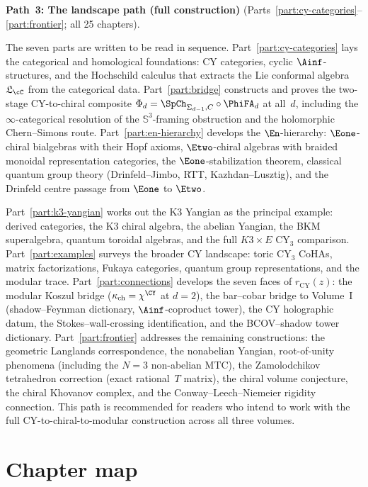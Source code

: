 \medskip

\noindent\textbf{Path~3: The landscape path (full construction)}
(Parts~\ref{part:cy-categories}--\ref{part:frontier};
all 25 chapters).

\smallskip

\noindent
The seven parts are written to be read in sequence.
Part~\ref{part:cy-categories} lays the categorical and
homological foundations: CY categories, cyclic
$\Ainf$-structures, and the Hochschild calculus that extracts
the Lie conformal algebra~$\mathfrak{L}_\cC$ from the
categorical data. Part~\ref{part:bridge} constructs and proves
the two-stage CY-to-chiral composite
$\Phi_d = \SpCh_{\Sigma_{d-1}, C}\circ\PhiFA_d$ at all~$d$,
including the $\infty$-categorical resolution of the
$\mathbb{S}^3$-framing obstruction and the holomorphic
Chern--Simons route. Part~\ref{part:en-hierarchy} develops
the $\En$-hierarchy: $\Eone$-chiral bialgebras with their
Hopf axioms, $\Etwo$-chiral algebras with braided monoidal
representation categories, the $\Eone$-stabilization theorem,
classical quantum group theory (Drinfeld--Jimbo, RTT,
Kazhdan--Lusztig), and the Drinfeld centre passage from
$\Eone$ to $\Etwo$.

Part~\ref{part:k3-yangian} works out the K3 Yangian as the
principal example: derived categories, the K3 chiral algebra,
the abelian Yangian, the BKM superalgebra, quantum toroidal
algebras, and the full \(K3 \times E\) CY$_3$ comparison.
Part~\ref{part:examples} surveys the broader CY landscape:
toric CY$_3$ CoHAs, matrix factorizations, Fukaya categories,
quantum group representations, and the modular trace.
Part~\ref{part:connections} develops the seven faces of
$r_{\mathrm{CY}}(z)$: the modular Koszul bridge
($\kappa_{\mathrm{ch}} = \chi^{\CY}$ at $d = 2$), the
bar--cobar bridge to Volume~I (shadow--Feynman dictionary,
$\Ainf$-coproduct tower), the CY holographic datum, the
Stokes--wall-crossing identification, and the BCOV--shadow
tower dictionary. Part~\ref{part:frontier} addresses the remaining
constructions: the geometric Langlands correspondence, the nonabelian
Yangian, root-of-unity phenomena (including the $N = 3$
non-abelian MTC), the Zamolodchikov tetrahedron correction
(exact rational~$T$ matrix), the chiral volume conjecture,
the chiral Khovanov complex, and the Conway--Leech--Niemeier
rigidity connection. This path is recommended for readers
who intend to work with the full CY-to-chiral-to-modular
construction across all three volumes.

\section{Chapter map}
\label{sec:maturity-scope}

